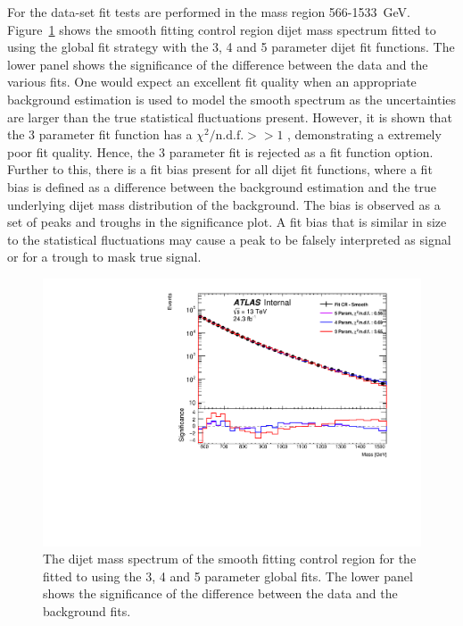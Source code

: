 For the \lm{} data-set fit tests are performed in the mass region 566-1533~GeV.
Figure~\ref{fig:lowmass_globalFit} shows the smooth fitting control region dijet mass spectrum fitted to
using the global fit strategy with the 3, 4 and 5 parameter dijet fit functions.
The lower panel shows the significance of the difference between the data and the various fits.
One would expect an excellent fit quality when an appropriate background estimation is used
to model the smooth spectrum as the uncertainties are larger than the true statistical fluctuations present.
However, it is shown that the 3 parameter fit function has a $\chi^{2}/\text{n.d.f.} >> 1$ , demonstrating a extremely poor fit quality.
Hence, the 3 parameter fit is rejected as a fit function option.
Further to this, there is a fit bias present for all dijet fit functions,
where a fit bias is defined as a difference between the background estimation and the true underlying dijet mass distribution of the background.
The bias is observed as a set of peaks and troughs in the significance plot.
A fit bias that is similar in size to the statistical fluctuations
may cause a peak to be falsely interpreted as signal or for a trough to mask true signal.

\begin{figure}[!htb]
\centering
\includegraphics[width=0.6\linewidth, angle=0]{figs/Dibjet/LowMass/FitStudy_min566/globalFit_lm_dH.pdf}

\caption{\label{fig:lowmass_globalFit}
  The dijet mass spectrum of the smooth fitting control region for the \lm{}
  fitted to using the 3, 4 and 5 parameter global fits.
  The lower panel shows the significance of the difference between the data and the background fits.}
\end{figure}

